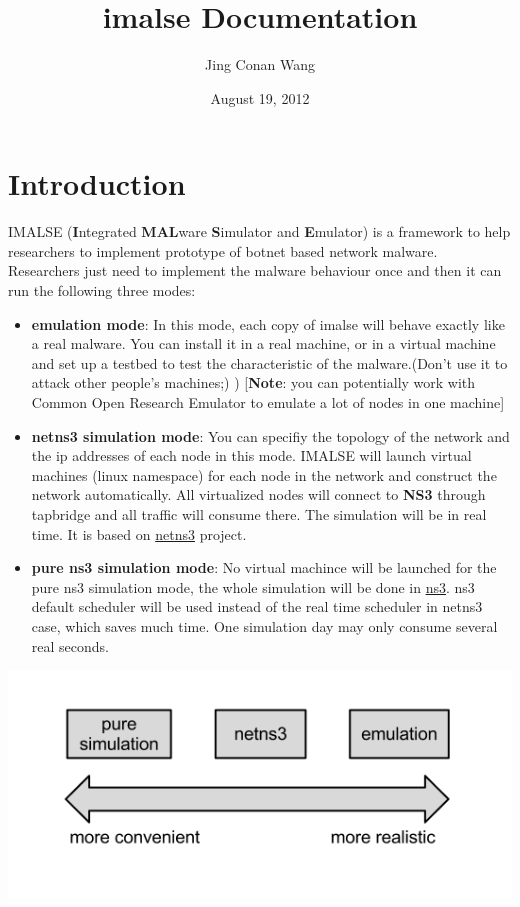 \documentclass[letterpaper,10pt,english]{sphinxmanual}
\title{imalse Documentation}
\date{August 19, 2012}
\author{Jing Conan Wang}
\begin{document}
\maketitle
\tableofcontents
{}\label{index::doc}



\chapter{Introduction}
\label{index:introduction}\label{index:welcome-to-imalse-s-documentation}
IMALSE (\textbf{I}ntegrated   \textbf{MAL}ware \textbf{S}imulator and \textbf{E}mulator) is
a framework to help researchers to implement prototype of botnet based network
malware. Researchers just need to implement the malware behaviour once and then
it can run the following three modes:
\begin{itemize}
\item {} 
\textbf{emulation mode}: In this mode, each copy of imalse will behave exactly
like a real malware. You can install it in a real machine, or in a virtual
machine and set up a testbed to test the characteristic of the
malware.(Don't use it to attack other people's machines;) ) {[}\textbf{Note}: you
can potentially work with Common Open Research Emulator to emulate a lot
of nodes in one machine{]}

\item {} 
\textbf{netns3 simulation mode}:  You can specifiy the topology of the network
and the ip addresses of each node in this mode. IMALSE will launch virtual
machines (linux namespace) for each node in the network and construct  the
network automatically. All virtualized nodes will connect to \textbf{NS3}
through tapbridge and all traffic will consume there. The simulation will
be in real time. It is based on \href{http://www.nsnam.org/wiki/index.php/HOWTO\_use\_Linux\_namespaces\_with\_ns-3}{netns3}
project.

\item {} 
\textbf{pure ns3 simulation mode}: No virtual machince will be launched for the
pure ns3 simulation mode, the whole simulation will be done in \href{http://www.nsnam.org/}{ns3}. ns3 default scheduler will be used instead of
the real time scheduler in netns3 case, which saves much time. One
simulation day may only consume several real seconds.

\end{itemize}

{\hfill\includegraphics{imalse-abstract.png}\hfill}
\end{document}
